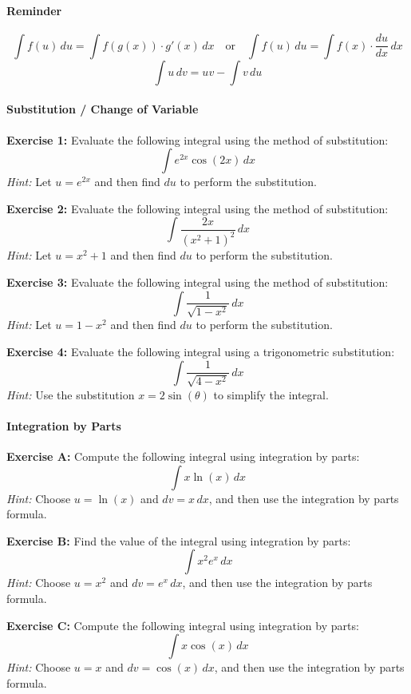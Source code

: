 \documentclass[]{article}
\begin{document}
	\paragraph{Reminder}
	$$\int f(u) \, du = \int f(g(x)) \cdot g'(x) \, dx \quad \text {or} \quad \int f(u) \, du = \int f(x) \cdot \frac{du}{dx} \, dx$$
	$$\int u \, dv = uv - \int v \, du$$
	
	\paragraph{Substitution / Change of Variable}\mbox{}
	
	\textbf{Exercise 1:}
	Evaluate the following integral using the method of substitution:
	\[
	\int e^{2x} \cos(2x) \, dx
	\]
	\textit{Hint:} Let \( u = e^{2x} \) and then find \( du \) to perform the substitution.
	
	\textbf{Exercise 2:}
	Evaluate the following integral using the method of substitution:
	\[
	\int \frac{2x}{(x^2 + 1)^2} \, dx
	\]
	\textit{Hint:} Let \( u = x^2 + 1 \) and then find \( du \) to perform the substitution.
	
	\textbf{Exercise 3:}
	Evaluate the following integral using the method of substitution:
	\[
	\int \frac{1}{\sqrt{1 - x^2}} \, dx
	\]
	\textit{Hint:} Let \( u = 1 - x^2 \) and then find \( du \) to perform the substitution.
	
	\textbf{Exercise 4:}
	Evaluate the following integral using a trigonometric substitution:
	\[
	\int \frac{1}{\sqrt{4 - x^2}} \, dx
	\]
	\textit{Hint:} Use the substitution \(x = 2\sin(\theta)\) to simplify the integral.
	
	
	\paragraph{Integration by Parts}\mbox{}
	
	\textbf{Exercise A:}
	Compute the following integral using integration by parts:
	\[
	\int x \ln(x) \, dx
	\]
	\textit{Hint:} Choose \( u = \ln(x) \) and \( dv = x \, dx \), and then use the integration by parts formula.
	
	\textbf{Exercise B:}
	Find the value of the integral using integration by parts:
	\[
	\int x^2 e^x \, dx
	\]
	\textit{Hint:} Choose \( u = x^2 \) and \( dv = e^x \, dx \), and then use the integration by parts formula.
	
	\textbf{Exercise C:}
	Compute the following integral using integration by parts:
	\[
	\int x \cos(x) \, dx
	\]
	\textit{Hint:} Choose \( u = x \) and \( dv = \cos(x) \, dx \), and then use the integration by parts formula.
	
\end{document}
